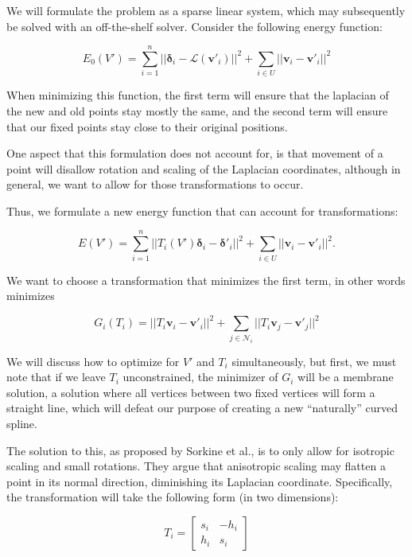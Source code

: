 \documentclass[english]{article}
\begin{document}
We will formulate the problem as a sparse linear system, which may subsequently be solved with an off-the-shelf solver. Consider the following energy function:

\[
E_0(V') = \sum_{i = 1}^n || \mathbf{\delta}_i - \mathcal{L}(\mathbf{v'}_i) ||^2 + \sum_{i \in U} || \mathbf{v}_i - \mathbf{v'}_i||^2
\]

When minimizing this function, the first term will ensure that the laplacian of the new and old points stay mostly the same, and the second term will ensure that our fixed points stay close to their original positions.

One aspect that this formulation does not account for, is that movement of a point will disallow rotation and scaling of the Laplacian coordinates, although in general, we want to allow for those transformations to occur. 

Thus, we formulate a new energy function that can account for transformations:

\begin{equation}
  E(V') = \sum_{i = 1}^n || T_i(V') \mathbf{\delta}_i - \mathbf{\delta'}_i||^2 + \sum_{i \in U} || \mathbf{v}_i - \mathbf{v'}_i||^2.
  \label{eq1}
\end{equation}

We want to choose a transformation that minimizes the first term, in other words minimizes

\[
G_i(T_i) = || T_i\mathbf{v}_i - \mathbf{v'}_i ||^2 + \sum_{j \in \mathcal{N}_i}||T_i \mathbf{v}_j - \mathbf{v'}_j||^2
\]

We will discuss how to optimize for $V'$ and $T_i$ simultaneously, but first, we must note that if we leave $T_i$ unconstrained, the minimizer of $G_i$ will be a membrane solution, a solution where all vertices between two fixed vertices will form a straight line, which will defeat our purpose of creating a new ``naturally'' curved spline.

The solution to this, as proposed by Sorkine et al., is to only allow for isotropic scaling and small rotations. They argue that anisotropic scaling may flatten a point in its normal direction, diminishing its Laplacian coordinate. Specifically, the transformation will take the following form (in two dimensions):

\[
T_i = \left[
  \begin{matrix}
    s_i & -h_i \\
    h_i & s_i
  \end{matrix}
  \right]
\]
\end{document}

